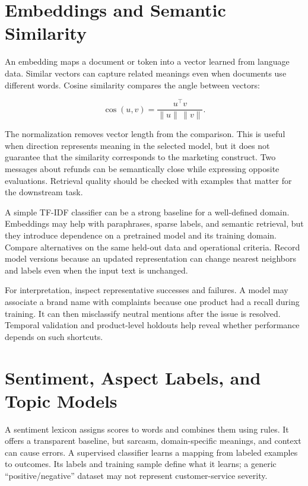\hypertarget{M05-embeddings-and-semantic-similarity}{%
\section{Embeddings and Semantic
Similarity}\label{M05-embeddings-and-semantic-similarity}}

\noindent An embedding maps a document or token into a vector learned from
language data. Similar vectors can capture related meanings even when
documents use different words. Cosine similarity compares the angle
between vectors:

\[
\operatorname{cos}(u,v)=\frac{u^\top v}{\|u\|\,\|v\|}.
\]

The normalization removes vector length from the comparison. This is
useful when direction represents meaning in the selected model, but it
does not guarantee that the similarity corresponds to the marketing
construct. Two messages about refunds can be semantically close while
expressing opposite evaluations. Retrieval quality should be checked
with examples that matter for the downstream task.

A simple TF-IDF classifier can be a strong baseline for a well-defined
domain. Embeddings may help with paraphrases, sparse labels, and
semantic retrieval, but they introduce dependence on a pretrained model
and its training domain. Compare alternatives on the same held-out data
and operational criteria. Record model versions because an updated
representation can change nearest neighbors and labels even when the
input text is unchanged.

For interpretation, inspect representative successes and failures. A
model may associate a brand name with complaints because one product had
a recall during training. It can then misclassify neutral mentions after
the issue is resolved. Temporal validation and product-level holdouts
help reveal whether performance depends on such shortcuts.

\hypertarget{M05-sentiment-aspect-labels-and-topic-models}{%
\section{Sentiment, Aspect Labels, and Topic
Models}\label{M05-sentiment-aspect-labels-and-topic-models}}

\noindent A sentiment lexicon assigns scores to words and combines them using
rules. It offers a transparent baseline, but sarcasm, domain-specific
meanings, and context can cause errors. A supervised classifier learns a
mapping from labeled examples to outcomes. Its labels and training
sample define what it learns; a generic ``positive/negative'' dataset
may not represent customer-service severity.

